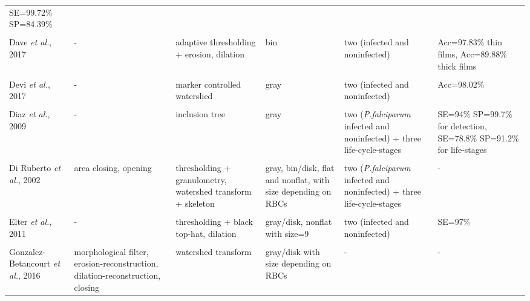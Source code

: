 \begin{longtable}{C{2.1cm} C{2.7cm} C{2.2cm} C{2.0cm} C{2.7cm} C{2.0cm} }
		SE=99.72\% SP=84.39\%
        \\
&   &  &  &  & \\
    Dave \emph{et al.}, 2017 &
		- &
		adaptive thresholding + erosion, dilation &	
		bin &
		two (infected and noninfected) &
		Acc=97.83\% thin films, Acc=89.88\% thick films
        \\
&   &  &  &  & \\
    Devi \emph{et al.}, 2017 &
		- &
		marker controlled watershed &	
		gray &
		two (infected and noninfected)  &
		Acc=98.02\%
        \\
&   &  &  &  & \\
    Diaz \emph{et al.}, 2009 &
		- &
		inclusion tree &	
		gray &
		two (\emph{P.falciparum} infected and noninfected) + three life-cycle-stages &
		SE=94\% SP=99.7\% for detection, SE=78.8\% SP=91.2\% for life-stages
		\\
&   &  &  &  & \\
    Di Ruberto \emph{et al.}, 2002 &
		area closing, opening &
		thresholding + granulometry, watershed  transform + skeleton &	
		gray, bin/disk, flat and nonflat, with size depending on RBCs &
		two (\emph{P.falciparum} infected and noninfected) + three life-cycle-stages &
		-
		\\
&   &  &  &  & \\
    Elter \emph{et al.}, 2011 &
		- &
		thresholding + black top-hat, dilation &	
		gray/disk, nonflat with size=9 &
		two (infected and noninfected) &
		SE=97\%
\\
&   &  &  &  & \\
    Gonzalez-Betancourt \emph{et al.}, 2016  &
    	morphological filter, erosion-reconstruction, dilation-reconstruction, closing &
    	watershed  transform  &
    	gray/disk with size depending on RBCs &
    	- &
    	-
    \\

\end{longtable}
